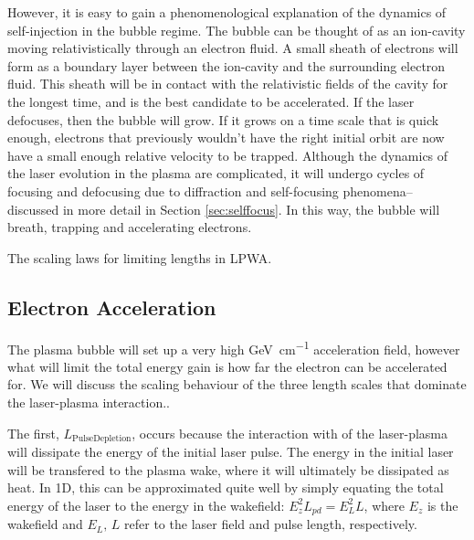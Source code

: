 \documentclass[12pt,letter]{article}
\begin{document}
However, it is easy to gain a phenomenological explanation of the dynamics of
self-injection in the bubble regime. The bubble can be thought of as an
ion-cavity moving relativistically through an
electron fluid. A small sheath of electrons will form as a boundary layer
between the ion-cavity and the surrounding electron fluid. This sheath will be
in contact with the relativistic fields of the cavity for the longest time, and
is the best candidate to be accelerated. If the laser defocuses, then the bubble
will grow. If it grows on a time scale that is quick enough, electrons that
previously wouldn't have the right initial orbit are now have a small enough
relative velocity to be trapped. Although the dynamics of the laser evolution in
the plasma are complicated, it will undergo cycles of focusing and defocusing
due to diffraction and self-focusing phenomena-- discussed in more detail in
Section \ref{sec:selffocus}. In this way, the bubble will breath, trapping and
accelerating electrons. 

\begin{margintable}[0pt]
\caption{The scaling laws for limiting lengths in LPWA.}
\end{margintable}
    
    \subsection{Electron Acceleration}
    The plasma bubble will set up a very high \si{\giga \electronvolt \per
\centi \meter} acceleration field, however what will limit the total energy
    gain is how far the electron can be accelerated for. 
    We will discuss the scaling behaviour of the three length scales that
    dominate the laser-plasma
    interaction..
    

    The first, $L_\mathrm{Pulse Depletion}$, occurs because the interaction
    with of the laser-plasma will dissipate the energy of the initial laser
    pulse. The energy in the initial laser will be transfered to the plasma
    wake, where it will ultimately be dissipated as heat. In 1D, this can
    be approximated quite well by simply equating
    the total energy of the laser to the energy in the wakefield:
    $E_z^2L_{pd} = E_L^2L$, where $E_z$ is the wakefield and $E_L, \,L$ refer
    to the laser field and pulse length,
    respectively\cite{RevModPhys.81.1229}.
\end{document}
